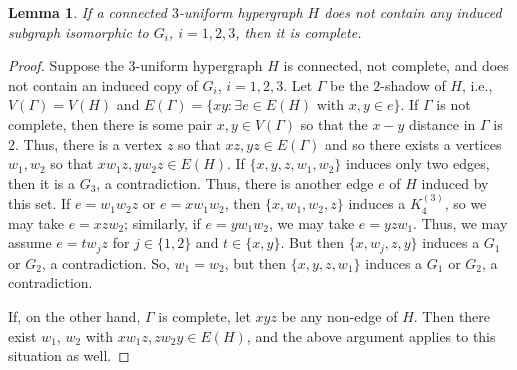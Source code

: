 \documentclass[12pt]{article}
\numberwithin{equation}{section}
\newtheorem{lemma}[theorem]{Lemma}
\theoremstyle{definition}
\begin{document}
\begin{lemma}
\label{lem:connected_implies_complete}
If a connected $3$-uniform hypergraph $H$ does not contain any induced subgraph isomorphic to $G_i$, $i=1,2,3$, then it is complete. 
\end{lemma}
\begin{proof}
Suppose the $3$-uniform hypergraph $H$ is connected, not complete, and does not contain an induced copy of $G_i$, $i=1,2,3$.  Let $\Gamma$ be the $2$-shadow of $H$, i.e., $V(\Gamma)=V(H)$ and $E(\Gamma) = \{xy : \exists e \in E(H) \textrm{ with } x,y \in e\}$.  If $\Gamma$ is not complete, then there is some pair $x,y \in V(\Gamma)$ so that the $x-y$ distance in $\Gamma$ is $2$.  Thus, there is a vertex $z$ so that $xz, yz \in E(\Gamma)$ and so there exists a vertices $w_1,w_2$ so that $xw_1z, yw_2z \in E(H)$.  If $\{x,y,z,w_1,w_2\}$ induces only two edges, then it is a $G_3$, a contradiction.  Thus, there is another edge $e$ of $H$ induced by this set.  If $e=w_1w_2z$ or $e=xw_1w_2$, then $\{x,w_1,w_2,z\}$ induces a $K^{(3)}_4$, so we may take $e=xzw_2$; similarly, if $e=yw_1w_2$, we may take $e=yzw_1$.  Thus, we may assume $e=tw_jz$ for $j \in \{1,2\}$ and $t \in \{x,y\}$.  But then $\{x,w_j,z,y\}$ induces a $G_1$ or $G_2$, a contradiction.  So, $w_1=w_2$, but then $\{x,y,z,w_1\}$ induces a $G_1$ or $G_2$, a contradiction. 

If, on the other hand, $\Gamma$ is complete, let $xyz$ be any non-edge of $H$.  Then there exist $w_1$, $w_2$ with $xw_1z,zw_2y \in E(H)$, and the above argument applies to this situation as well.
\end{proof}
\end{document}
